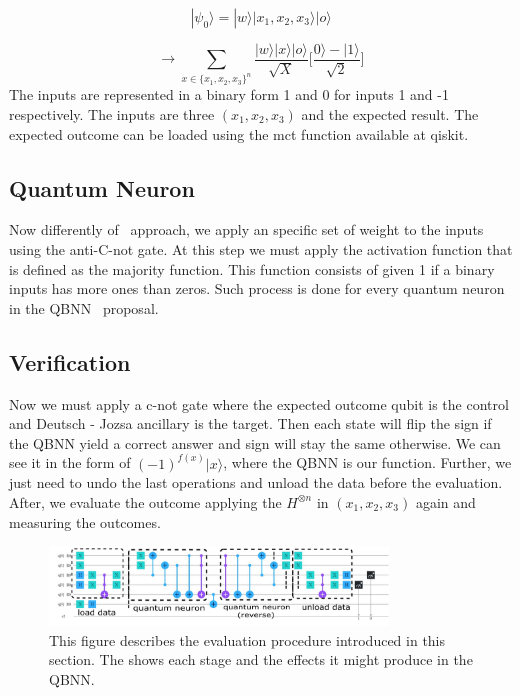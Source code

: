 \documentclass[conference]{IEEEtran}
\begin{document}
  \begin{equation}
          |\psi_0\rangle = |w\rangle|x_1, x_2, x_3\rangle|o\rangle
  \end{equation}

  \begin{equation}
          \rightarrow \sum_{x \in \{x_1, x_2, x_3\}^n}
          \frac{|w\rangle|x\rangle|o\rangle}{\sqrt{X}}\Bigg[\frac{0\rangle - |1\rangle}{\sqrt{2}}\Bigg]
  \end{equation}
  The inputs are represented in a binary form 1 and 0 for inputs 1 and -1 respectively.
  The inputs are three  $(x_1, x_2, x_3)$ and the expected result.
  The expected outcome can be loaded using the mct function available at qiskit.

\subsection{Quantum Neuron}\label{subsec:quantum-neuron}
  Now differently of~\cite{fawaz2019training} approach, we apply an specific set of weight to the inputs using the
  anti-C-not gate.
  At this step we must apply the activation function that is defined as the majority function.
 This function consists of given 1 if a binary inputs has more ones than zeros.
  Such process is done for every quantum neuron in the QBNN~\cite{fawaz2019training} proposal.

\subsection{Verification}\label{subsec:verification}
  Now we must apply a c-not gate where the expected outcome qubit is the control and Deutsch - Jozsa ancillary is the target.
 Then each state will flip the sign if the QBNN yield a correct answer and sign will stay the same otherwise.
 We can see it in the form of \((-1)^{f(x)}|x\rangle\), where the QBNN is our function.
 Further, we just need to undo the last operations and unload the data before the evaluation.
 After, we evaluate the outcome applying the $H^{\otimes n}$ in $(x_1, x_2, x_3)$ again and measuring the outcomes.

\begin{figure}[h!]
    \centering
    \includegraphics[width=9cm, scale=0.5]{images/circuit.pdf}
    \caption{This figure describes the evaluation procedure introduced in this section.
    The shows each stage and the effects it might produce in the QBNN.}\label{Fig:Stages}
\end{figure}
\end{document}
